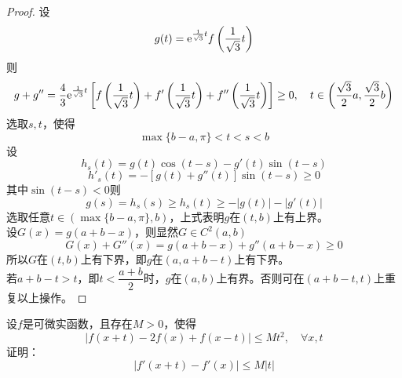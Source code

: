 \begin{proof}

    设
    $$g(t) = \mathrm{e}^{\frac{1}{\sqrt{3}}t}f\left( \frac{1}{\sqrt{3}}t \right)$$
    则
    $$g + g'' = \dfrac{4}{3}\mathrm{e}^{\frac{1}{\sqrt{3}}t} \left[ f\left(\dfrac{1}{\sqrt{3}}t\right) + f'\left(\frac{1}{\sqrt{3}}t\right) + f''\left(\frac{1}{\sqrt{3}}t\right) \right] \geq 0, \quad t \in \left( \dfrac{\sqrt{3}}{2}a, \dfrac{\sqrt{3}}{2}b \right)$$
    选取$s,t$，使得
    $$\max\{b-a, \pi\} < t < s < b$$
    设
    $$h_s(t) = g(t) \cos{(t-s)} - g'(t)\sin{(t-s)}$$
    $$h'_s(t) = -[g(t) + g''(t)] \sin{(t-s)} \geq 0$$
    其中$\sin{(t-s)} < 0$则
    $$g(s) = h_s(s) \geq h_s(t) \geq -|g(t)| - |g'(t)|$$
    选取任意$t \in (\max\{b-a,\pi\},b)$，上式表明$g$在$(t,b)$上有上界。\\
    设$G(x) = g(a + b -x)$，则显然$G \in C^2(a,b)$
    $$G(x) + G''(x) = g(a+b-x) + g''(a+b-x) \geq 0$$
    所以$G$在$(t,b)$上有下界，即$g$在$(a, a+b-t)$上有下界。\\
    若$a + b -t > t$，即$t < \dfrac{a+b}{2}$时，$g$在$(a,b)$上有界。否则可在$(a+b -t ,t)$上重复以上操作。

\end{proof}

\begin{proposition}

    设$f$是可微实函数，且存在$M > 0$，使得
    $$|f(x+t) - 2f(x) + f(x-t)| \leq Mt^2, \quad \forall x,t$$
    证明：
    $$|f'(x+t) - f'(x)| \leq M|t|$$

\end{proposition}

